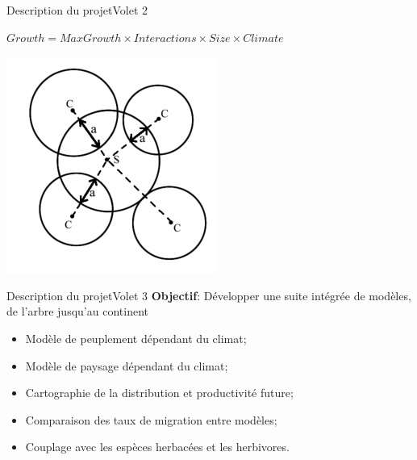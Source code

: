 \documentclass{eecslides}
\begin{document}
	\begin{frame}{Description du projet}{Volet 2}

		\begin{center}
			$Growth = MaxGrowth \times Interactions\times Size \times Climate $
		\end{center}
		
		\begin{center}
		\includegraphics[height=0.4\textheight]{neighborhood}\\
		\end{center}
		
	\end{frame}

	
	\begin{frame}{Description du projet}{Volet 3}
	\textbf{Objectif}: Développer une suite intégrée de modèles, de l'arbre jusqu'au continent 

		\begin{itemize}
			\item Modèle de peuplement dépendant du climat;
			\item Modèle de paysage dépendant du climat;
			\item Cartographie de la distribution et productivité future;
			\item Comparaison des taux de migration entre modèles;
			\item Couplage avec les espèces herbacées et les herbivores.
		\end{itemize}
	\end{frame}

	
\end{document}
